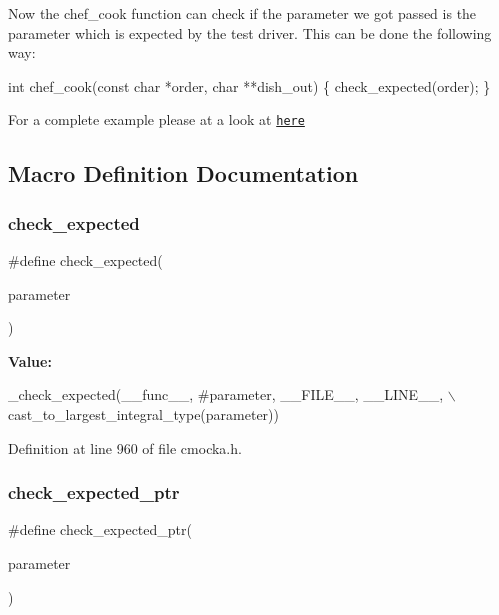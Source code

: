 Now the chef\+\_\+cook function can check if the parameter we got passed is the parameter which is expected by the test driver. This can be done the following way\+:


\begin{DoxyCode}
\textcolor{keywordtype}{int} chef\_cook(\textcolor{keyword}{const} \textcolor{keywordtype}{char} *order, \textcolor{keywordtype}{char} **dish\_out)
\{
    check\_expected(order);
\}
\end{DoxyCode}


For a complete example please at a look at \href{http://git.cryptomilk.org/projects/cmocka.git/tree/example/chef_wrap/waiter_test_wrap.c}{\tt here} 

\subsection{Macro Definition Documentation}
\mbox{\label{group__cmocka__param_gae009bd026b303c0ba0fa19d723532367}} 
\subsubsection{\texorpdfstring{check\+\_\+expected}{check\_expected}}
{\footnotesize\ttfamily \#define check\+\_\+expected(\begin{DoxyParamCaption}\item[{}]{parameter }\end{DoxyParamCaption})}

{\bfseries Value\+:}
\begin{DoxyCode}
\_check\_expected(\_\_func\_\_, #parameter, \_\_FILE\_\_, \_\_LINE\_\_, \(\backslash\)
                    cast\_to\_largest\_integral\_type(parameter))
\end{DoxyCode}


Definition at line 960 of file cmocka.\+h.

\mbox{\label{group__cmocka__param_gaf76c5ffc9f06fe66a338178a91964bf3}} 
\subsubsection{\texorpdfstring{check\+\_\+expected\+\_\+ptr}{check\_expected\_ptr}}
{\footnotesize\ttfamily \#define check\+\_\+expected\+\_\+ptr(\begin{DoxyParamCaption}\item[{}]{parameter }\end{DoxyParamCaption})}

